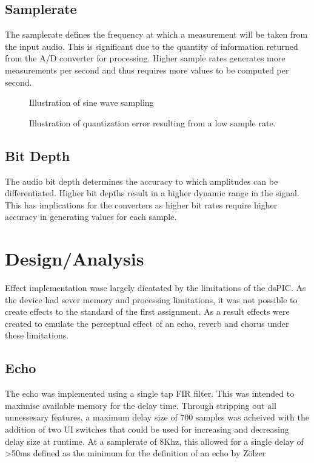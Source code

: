 \documentclass[titlepage]{scrartcl}
\begin{document}
    \subsection{Samplerate}
    The samplerate defines the frequency at which a measurement will be taken
    from the input audio. This is significant due to the quantity of
    information returned from the A/D converter for processing. Higher sample
    rates generates more measurements per second and thus requires more values
    to be computed per second.
    \begin{figure}[H]
        \caption{Illustration of sine wave sampling}
    \end{figure}
    \begin{figure}[H]
        \caption{Illustration of quantization error resulting from a low sample
        rate.}
    \end{figure}

    \subsection{Bit Depth}
    The audio bit depth determines the accuracy to which amplitudes can be
    differentiated. Higher bit depths result in a higher dynamic range in the
    signal. This has implications for the converters as higher bit rates
    require higher accuracy in generating values for each sample.

    \section{Design/Analysis}
    Effect implementation wase largely dicatated by the limitations of the
    dsPIC. As the device had sever memory and processing limitations, it was
    not possible to create effects to the standard of the first assignment. As
    a result effects were created to emulate the perceptual effect of an echo,
    reverb and chorus under these limitations.

    \subsection{Echo}
    The echo was implemented using a single tap FIR filter. This was intended
    to maximise available memory for the delay time. Through stripping out all
    unnessesary features, a maximum delay size of 700 samples was acheived with
    the addition of two UI switches that could be used for increasing and
    decreasing delay size at runtime.
    At a samplerate of 8Khz, this allowed for a single delay of \textgreater50ms defined
    as the minimum for the definition of an echo
    by Z{\"o}lzer~\citeyearpar[p.]{zolzer2011dafx}
\end{document}
